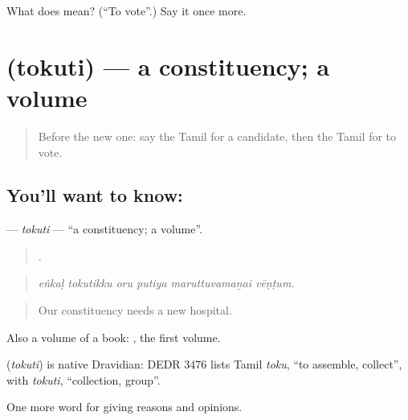 \begin{tcolorbox}[breakable,colback=teal!4,colframe=teal!35!black,title={Before you move on}]
What does  mean? (\textquotedblleft{}To vote\textquotedblright{}.) Say it once more.
\end{tcolorbox}
\section[\texorpdfstring{\ta{தொகுதி} (tokuti)}{தொகுதி (tokuti)}]{ (tokuti) — a constituency; a volume}

\label{lesson:TA-C374-tokuti}



\begin{quote}
Before the new one: say the Tamil for a candidate, then the Tamil for to vote.
\end{quote}

\subsection*{You'll want to know: }
\textbf{} — \emph{tokuti} — \textquotedblleft{}a constituency; a volume\textquotedblright{}.

\begin{quote}
     .
\end{quote}

\begin{quote}
\emph{eṅkaḷ tokutikku oru putiya maruttuvamaṉai vēṇṭum.}
\end{quote}

\begin{quote}
Our constituency needs a new hospital.
\end{quote}

Also a volume of a book:  , the first volume.

\begin{cousinweb}
\textbf{} (\emph{tokuti}) is native Dravidian: DEDR 3476 lists Tamil \emph{toku}, \textquotedblleft{}to assemble, collect\textquotedblright{}, with \emph{tokuti}, \textquotedblleft{}collection, group\textquotedblright{}.
\end{cousinweb}

\begin{grammarlens}[title={What you've built}]
One more word for giving reasons and opinions.
\end{grammarlens}

